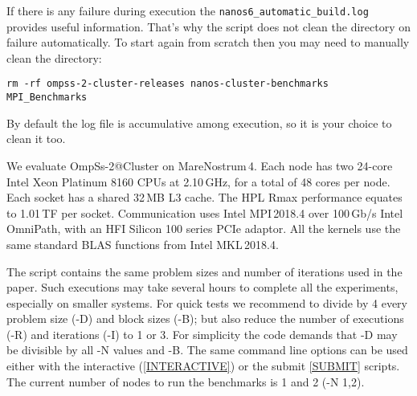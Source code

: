 \documentclass{article}
\newcommand{\code}[1]{\texttt{#1}}
\begin{document}
If there is any failure during execution the
\code{nanos6\_automatic\_build.log} provides useful
information. That's why the script does not clean the directory on
failure automatically.  To start again from scratch then you may need
to manually clean the directory:

\begin{lstlisting}
rm -rf ompss-2-cluster-releases nanos-cluster-benchmarks MPI_Benchmarks
\end{lstlisting}

By default the log file is accumulative among execution, so it is your
choice to clean it too.

We evaluate OmpSs-2@Cluster on MareNostrum\,4. Each node has two
24-core Intel Xeon Platinum 8160 CPUs at 2.10\,GHz, for a total of 48
cores per node.  Each socket has a shared 32\,MB L3 cache.  The HPL
Rmax performance equates to 1.01\,TF per socket.  Communication uses
Intel MPI\,2018.4 over 100\,Gb/s Intel OmniPath, with an HFI Silicon
100 series PCIe adaptor.  All the kernels use the same standard BLAS
functions from Intel MKL\,2018.4.

The script contains the same problem sizes and number of iterations
used in the paper. Such executions may take several hours to complete
all the experiments, especially on smaller systems. For quick tests we
recommend to divide by 4 every problem size (-D) and block sizes (-B);
but also reduce the number of executions (-R) and iterations (-I) to 1
or 3. For simplicity the code demands that -D may be divisible by all
-N values and -B. The same command line options can be used either
with the interactive (\ref{INTERACTIVE}) or the submit \ref{SUBMIT}
scripts. The current number of nodes to run the benchmarks is 1 and 2
(-N 1,2).
\end{document}
